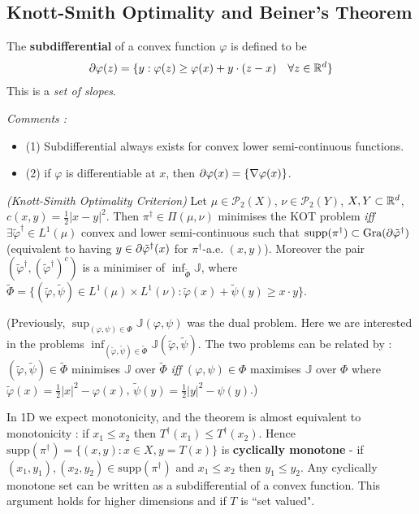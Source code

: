 \documentclass[12pt,a4paper]{article}
\renewenvironment{i}
{\begin{itemize} 
	}%
	{\end{itemize}
}
\begin{document}
\subsection{Knott-Smith Optimality and Beiner's Theorem}

 The \textbf{subdifferential} of a convex function $\varphi$ is defined to be
\begin{align*}
\partial \varphi(z) = \{y : \varphi(z) \geq \varphi(x) + y\cdot (z-x) \quad \forall z\in \mathbb{R}^d \}
\end{align*}
This is a \emph{set of slopes}.
\s

\emph{Comments :}
\begin{i}
\item[(1)] Subdifferential always exists for convex lower semi-continuous functions.
\item[(2)] if $\varphi$ is differentiable at $x$, then $\partial \varphi(x) = \{ \nabla \varphi(x) \}$.
\end{i}
\s

 \emph{(Knott-Simith Optimality Criterion)} Let $\mu \in \mathscr{P}_2(X)$, $\nu \in \mathscr{P}_2(Y)$, $X, Y \subset \mathbb{R}^d$, $c(x,y)= \frac{1}{2}|x-y|^2$. Then $\pi^{\dagger} \in \Pi(\mu, \nu)$ minimises the KOT problem \emph{iff} $\exists \tilde{\varphi}^{\dagger} \in L^1(\mu)$ convex and lower semi-continuous such that $\text{supp}(\pi^{\dagger}) \subset \text{Gra}( \partial \tilde{\varphi}^{\dagger})$ (equivalent to having $y\in \partial \tilde{\varphi}^{\dagger}(x)$ for $\pi^{\dagger}$-a.e. $(x,y)$). Moreover the pair $(\tilde{\varphi}^{\dagger}, (\tilde{\varphi}^{\dagger})^c)$ is a minimiser of $\inf_{\tilde{\Phi}} \mathbb{J}$, where $\tilde{\Phi} = \{ (\tilde{\varphi}, \tilde{\psi}) \in L^1(\mu)\times L^1(\nu) : \tilde{\varphi}(x) + \tilde{\psi}(y) \geq x\cdot y \}$.
\s

(Previously, $\sup_{(\varphi, \psi) \in \Phi} \mathbb{J}(\varphi, \psi)$ was the dual problem. Here we are interested in the problems $\inf_{(\tilde{\varphi}, \tilde{\psi}) \in \tilde{\Phi}} \mathbb{J}(\tilde{\varphi}, \tilde{\psi})$. The two problems can be related by : $(\tilde{\varphi}, \tilde{\psi}) \in \tilde{\Phi}$ minimises $\mathbb{J}$ over $\tilde{\Phi}$ \emph{iff} $(\varphi, \psi) \in \Phi$ maximises $\mathbb{J}$ over $\Phi$ where $\tilde{\varphi}(x) = \frac{1}{2} |x|^2 - \varphi(x)$, $\tilde{\psi}(y) = \frac{1}{2} |y|^2 - \psi(y)$.)
\s

In 1D we expect monotonicity, and the theorem is almost equivalent to monotonicity : if $x_1 \leq x_2$ then $T^{\dagger}(x_1) \leq T^{\dagger}(x_2)$. Hence $\text{supp}(\pi^{\dagger}) = \{(x,y) : x\in X, y= T(x)\}$ is \textbf{cyclically monotone} - if $(x_1, y_1), (x_2, y_2) \in \text{supp}(\pi^{\dagger})$ and $x_1\leq x_2$ then $y_1 \leq y_2$. Any cyclically monotone set can be written as a subdifferential of a convex function. This argument holds for higher dimensions and if $T$ is ``set valued".
\s
\end{document}
